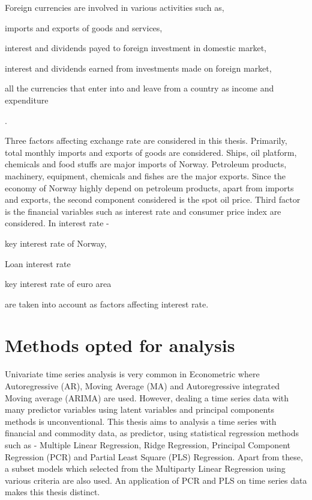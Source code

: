 \documentclass[12pt, lot, lof]{thesis}\usepackage[]{graphicx}\usepackage[]{color}
\begin{document}
Foreign currencies are involved in various activities such as, \begin{inlinelist} \item imports and exports of goods and services,\item interest and dividends payed to foreign investment in domestic market, \item interest and dividends earned from investments made on foreign market, \item all the currencies that enter into and leave from a country as income and expenditure \end{inlinelist}.

Three factors affecting exchange rate are considered in this thesis. Primarily, total monthly imports and exports of goods are considered. Ships, oil platform, chemicals and food stuffs are major imports of Norway. Petroleum products, machinery, equipment, chemicals and fishes are the major exports. Since the economy of Norway highly depend on petroleum products, apart from imports and exports,  the second component considered is the spot oil price. Third factor is the financial variables such as interest rate and consumer price index are considered. In interest rate - \begin{inlinelist}\item key interest rate of Norway, \item Loan interest rate \item key interest rate of euro area \end{inlinelist} are taken into account as factors affecting interest rate.

\section{Methods opted for analysis}
\label{sec:methodsOpted}
Univariate time series analysis is very common in Econometric where Autoregressive (AR), Moving Average (MA) and Autoregressive integrated Moving average (ARIMA) are used. However, dealing a time series data with many predictor variables using latent variables and principal components methods is unconventional. This thesis aims to analysis a time series with financial and commodity data, as predictor, using statistical regression methods such as - Multiple Linear Regression, Ridge Regression, Principal Component Regression (PCR) and Partial Least Square (PLS) Regression. Apart from these, a subset models which selected from the Multiparty Linear Regression using various criteria are also used. An application of PCR and PLS on time series data makes this thesis distinct.
\end{document}
